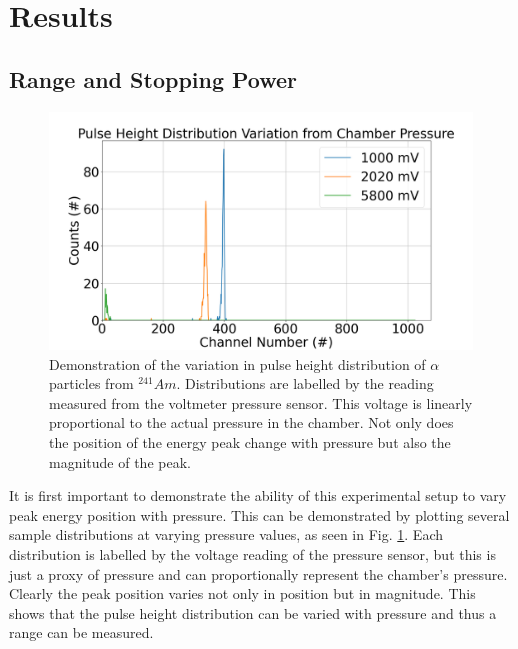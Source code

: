 \section{Results}

\subsection{Range and Stopping Power}

\begin{figure}
\centering
\includegraphics[scale=0.3]{variation.png}
\caption{Demonstration of the variation in pulse height distribution of $\alpha$ particles from ${}^{241}Am$. Distributions are labelled by the reading measured from the voltmeter pressure sensor. This voltage is linearly proportional to the actual pressure in the chamber. Not only does the position of the energy peak change with pressure but also the magnitude of the peak.}
\label{fig:variation}
\end{figure}

It is first important to demonstrate the ability of this experimental setup to vary peak energy position with pressure. This can be demonstrated by plotting several sample distributions at varying pressure values, as seen in Fig. \ref{fig:variation}. Each distribution is labelled by the voltage reading of the pressure sensor, but this is just a proxy of pressure and can proportionally represent the chamber’s pressure. Clearly the peak position varies not only in position but in magnitude. This shows that the pulse height distribution can be varied with pressure and thus a range can be measured.

